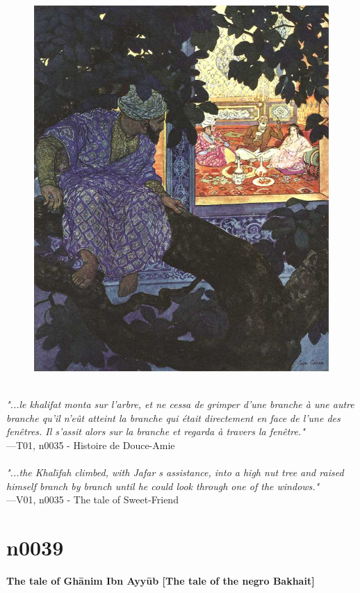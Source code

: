 \documentclass[../Carre_nights.tex]{subfiles}
\begin{document}
\begin{figure}[ht]
\centering
\includegraphics[height=\figsize]{illustrations/volume_1/T01, n0035 - Histoire de Douce-Amie.jpg}
\end{figure}

\textit{\\
"...le khalifat monta sur l’arbre, et ne cessa de grimper d’une branche à une autre branche qu’il n’eût atteint la branche qui était directement en face de l’une des fenêtres. Il s’assit alors sur la branche et regarda à travers la fenêtre."} \\
—T01, n0035 - Histoire de Douce-Amie \\~\\
\textit{"...the Khal\={\i}fah climbed, with Jafar s assistance, into a high nut tree and raised himself branch by branch until he could look through one of the windows."} \\
—V01, n0035 - The tale of Sweet-Friend

\newpage

\section{n0039}
\textbf{\Large{The tale of Gh\=anim Ibn Ayy\=ub [The tale of the negro Bakhait]}} \\
\end{document}
